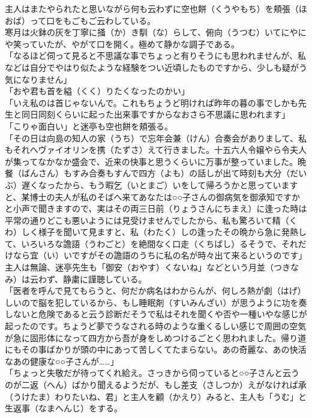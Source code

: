 \documentclass{book}
\begin{document}
主人はまたやられたと思いながら何も云わずに空也餅（くうやもち）を頬張（ほおば）って口をもごもご云わしている。\\
寒月は火鉢の灰を丁寧に掻（か）き馴（な）らして、俯向（うつむ）いてにやにや笑っていたが、やがて口を開く。極めて静かな調子である。\\
「なるほど伺って見ると不思議な事でちょっと有りそうにも思われませんが、私などは自分でやはり似たような経験をつい近頃したものですから、少しも疑がう気になりません」\\
「おや君も首を縊（くく）りたくなったのかい」\\
「いえ私のは首じゃないんで。これもちょうど明ければ昨年の暮の事でしかも先生と同日同刻くらいに起った出来事ですからなおさら不思議に思われます」\\
「こりゃ面白い」と迷亭も空也餅を頬張る。\\
「その日は向島の知人の家（うち）で忘年会兼（けん）合奏会がありまして、私もそれへヴァイオリンを携（たずさ）えて行きました。十五六人令嬢やら令夫人が集ってなかなか盛会で、近来の快事と思うくらいに万事が整っていました。晩餐（ばんさん）もすみ合奏もすんで四方（よも）の話しが出て時刻も大分（だいぶ）遅くなったから、もう暇乞（いとまご）いをして帰ろうかと思っていますと、某博士の夫人が私のそばへ来てあなたは○○子さんの御病気を御承知ですかと小声で聞きますので、実はその両三日前（りょうさんにちまえ）に逢った時は平常の通りどこも悪いようには見受けませんでしたから、私も驚ろいて精（くわ）しく様子を聞いて見ますと、私（わたく）しの逢ったその晩から急に発熱して、いろいろな譫語（うわごと）を絶間なく口走（くちばし）るそうで、それだけなら宜（い）いですがその譫語のうちに私の名が時々出て来るというのです」\\
主人は無論、迷亭先生も「御安（おやす）くないね」などという月並（つきなみ）は云わず、静粛に謹聴している。\\
「医者を呼んで見てもらうと、何だか病名はわからんが、何しろ熱が劇（はげ）しいので脳を犯しているから、もし睡眠剤（すいみんざい）が思うように功を奏しないと危険であると云う診断だそうで私はそれを聞くや否や一種いやな感じが起ったのです。ちょうど夢でうなされる時のような重くるしい感じで周囲の空気が急に固形体になって四方から吾が身をしめつけるごとく思われました。帰り道にもその事ばかりが頭の中にあって苦しくてたまらない。あの奇麗な、あの快活なあの健康な○○子さんが\ldots{}\ldots{}」\\
「ちょっと失敬だが待ってくれ給え。さっきから伺っていると○○子さんと云うのが二返（へん）ばかり聞えるようだが、もし差支（さしつか）えがなければ承（うけたま）わりたいね、君」と主人を顧（かえり）みると、主人も「うむ」と生返事（なまへんじ）をする。\\
\end{document}
